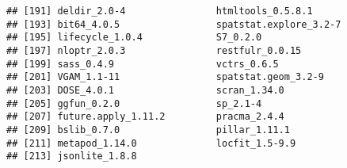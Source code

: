 \documentclass[
  11pt,
  a4paper,
]{article}
\begin{document}
\begin{verbatim}
## [191] deldir_2.0-4                htmltools_0.5.8.1          
## [193] bit64_4.0.5                 spatstat.explore_3.2-7     
## [195] lifecycle_1.0.4             S7_0.2.0                   
## [197] nloptr_2.0.3                restfulr_0.0.15            
## [199] sass_0.4.9                  vctrs_0.6.5                
## [201] VGAM_1.1-11                 spatstat.geom_3.2-9        
## [203] DOSE_4.0.1                  scran_1.34.0               
## [205] ggfun_0.2.0                 sp_2.1-4                   
## [207] future.apply_1.11.2         pracma_2.4.4               
## [209] bslib_0.7.0                 pillar_1.11.1              
## [211] metapod_1.14.0              locfit_1.5-9.9             
## [213] jsonlite_1.8.8
\end{verbatim}
\end{document}
